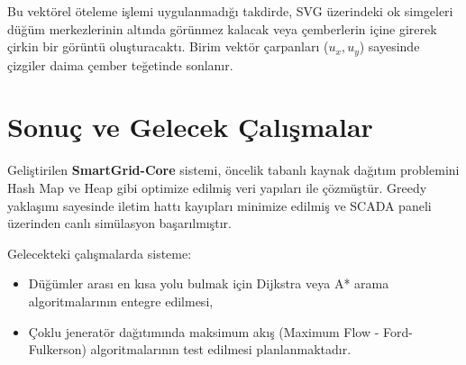 \documentclass[12pt,a4paper]{article}
\begin{document}
Bu vektörel öteleme işlemi uygulanmadığı takdirde, SVG üzerindeki ok simgeleri düğüm merkezlerinin altında görünmez kalacak veya çemberlerin içine girerek çirkin bir görüntü oluşturacaktı. Birim vektör çarpanları ($u_x, u_y$) sayesinde çizgiler daima çember teğetinde sonlanır.

\section{Sonuç ve Gelecek Çalışmalar}
Geliştirilen \textbf{SmartGrid-Core} sistemi, öncelik tabanlı kaynak dağıtım problemini Hash Map ve Heap gibi optimize edilmiş veri yapıları ile çözmüştür. Greedy yaklaşımı sayesinde iletim hattı kayıpları minimize edilmiş ve SCADA paneli üzerinden canlı simülasyon başarılmıştır.

Gelecekteki çalışmalarda sisteme:
\begin{itemize}
    \item Düğümler arası en kısa yolu bulmak için Dijkstra veya A* arama algoritmalarının entegre edilmesi,
    \item Çoklu jeneratör dağıtımında maksimum akış (Maximum Flow - Ford-Fulkerson) algoritmalarının test edilmesi planlanmaktadır.
\end{itemize}
\end{document}
